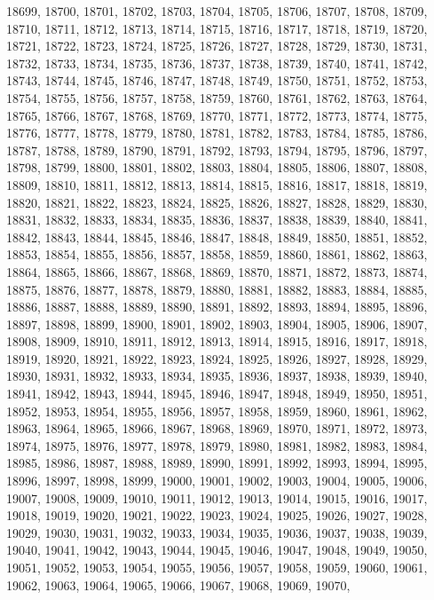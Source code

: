 18699,
18700,
18701,
18702,
18703,
18704,
18705,
18706,
18707,
18708,
18709,
18710,
18711,
18712,
18713,
18714,
18715,
18716,
18717,
18718,
18719,
18720,
18721,
18722,
18723,
18724,
18725,
18726,
18727,
18728,
18729,
18730,
18731,
18732,
18733,
18734,
18735,
18736,
18737,
18738,
18739,
18740,
18741,
18742,
18743,
18744,
18745,
18746,
18747,
18748,
18749,
18750,
18751,
18752,
18753,
18754,
18755,
18756,
18757,
18758,
18759,
18760,
18761,
18762,
18763,
18764,
18765,
18766,
18767,
18768,
18769,
18770,
18771,
18772,
18773,
18774,
18775,
18776,
18777,
18778,
18779,
18780,
18781,
18782,
18783,
18784,
18785,
18786,
18787,
18788,
18789,
18790,
18791,
18792,
18793,
18794,
18795,
18796,
18797,
18798,
18799,
18800,
18801,
18802,
18803,
18804,
18805,
18806,
18807,
18808,
18809,
18810,
18811,
18812,
18813,
18814,
18815,
18816,
18817,
18818,
18819,
18820,
18821,
18822,
18823,
18824,
18825,
18826,
18827,
18828,
18829,
18830,
18831,
18832,
18833,
18834,
18835,
18836,
18837,
18838,
18839,
18840,
18841,
18842,
18843,
18844,
18845,
18846,
18847,
18848,
18849,
18850,
18851,
18852,
18853,
18854,
18855,
18856,
18857,
18858,
18859,
18860,
18861,
18862,
18863,
18864,
18865,
18866,
18867,
18868,
18869,
18870,
18871,
18872,
18873,
18874,
18875,
18876,
18877,
18878,
18879,
18880,
18881,
18882,
18883,
18884,
18885,
18886,
18887,
18888,
18889,
18890,
18891,
18892,
18893,
18894,
18895,
18896,
18897,
18898,
18899,
18900,
18901,
18902,
18903,
18904,
18905,
18906,
18907,
18908,
18909,
18910,
18911,
18912,
18913,
18914,
18915,
18916,
18917,
18918,
18919,
18920,
18921,
18922,
18923,
18924,
18925,
18926,
18927,
18928,
18929,
18930,
18931,
18932,
18933,
18934,
18935,
18936,
18937,
18938,
18939,
18940,
18941,
18942,
18943,
18944,
18945,
18946,
18947,
18948,
18949,
18950,
18951,
18952,
18953,
18954,
18955,
18956,
18957,
18958,
18959,
18960,
18961,
18962,
18963,
18964,
18965,
18966,
18967,
18968,
18969,
18970,
18971,
18972,
18973,
18974,
18975,
18976,
18977,
18978,
18979,
18980,
18981,
18982,
18983,
18984,
18985,
18986,
18987,
18988,
18989,
18990,
18991,
18992,
18993,
18994,
18995,
18996,
18997,
18998,
18999,
19000,
19001,
19002,
19003,
19004,
19005,
19006,
19007,
19008,
19009,
19010,
19011,
19012,
19013,
19014,
19015,
19016,
19017,
19018,
19019,
19020,
19021,
19022,
19023,
19024,
19025,
19026,
19027,
19028,
19029,
19030,
19031,
19032,
19033,
19034,
19035,
19036,
19037,
19038,
19039,
19040,
19041,
19042,
19043,
19044,
19045,
19046,
19047,
19048,
19049,
19050,
19051,
19052,
19053,
19054,
19055,
19056,
19057,
19058,
19059,
19060,
19061,
19062,
19063,
19064,
19065,
19066,
19067,
19068,
19069,
19070,
